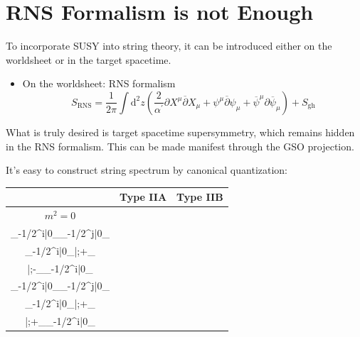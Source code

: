 \documentclass{beamer}
\begin{document}
\section[Why PS?]{RNS Formalism is not Enough}
	\begin{frame}
		To incorporate SUSY into string theory, it can be introduced either on the worldsheet or in the target spacetime.
		\begin{itemize}
			\item {\color{WHU} On the worldsheet: RNS formalism} 
			\begin{equation*}
				S_{\text{RNS}}=\frac{1}{2\pi}\int\mathrm{d}^2z\left(\frac{2}{\alpha^{\prime}}\partial X^\mu\overline{\partial}X_\mu+\psi^\mu\overline{\partial}\psi_\mu+\overline{\psi}^\mu\partial\overline{\psi}_\mu\right)+S_{\text{gh}}
			\end{equation*}
		\end{itemize}
		What is truly desired is target spacetime supersymmetry, which remains hidden in the RNS formalism. This can be made manifest through the {\color{WHU} GSO projection}. 
		
		It's easy to construct string spectrum by canonical quantization:
		\begin{table}[htbp]
			\centering
			\begin{tabular}{c|cc}
				\hline
				&Type IIA &Type IIB\\
				\hline
				$m^2=0$ 
				&\(\displaystyle
				\begin{gathered}
					|\alpha;-\rangle_{\mathrm{R}}\otimes|\alpha;+\rangle_{\mathrm{R}}\\\tilde{\psi}_{-1/2}^i|0\rangle_{\mathrm{NS}}\otimes \psi_{-1/2}^j|0\rangle_{\mathrm{NS}}\\\tilde{\psi}_{-1/2}^i|0\rangle_{\mathrm{NS}}\otimes|\alpha;+\rangle_{\mathrm{R}}\\|\dot\alpha;-\rangle_{\mathrm{R}}\otimes \psi_{-1/2}^i|0\rangle_{\mathrm{NS}}
				\end{gathered}
				\)
				&\(\displaystyle
				\begin{gathered}
					|\alpha;+\rangle_{\mathrm{R}}\otimes|\alpha;+\rangle_{\mathrm{R}}\\\tilde{\psi}_{-1/2}^i|0\rangle_{\mathrm{NS}}\otimes \psi_{-1/2}^j|0\rangle_{\mathrm{NS}}\\\tilde{\psi}_{-1/2}^i|0\rangle_{\mathrm{NS}}\otimes|\alpha;+\rangle_{\mathrm{R}}\\|\alpha;+\rangle_{\mathrm{R}}\otimes \psi_{-1/2}^i|0\rangle_{\mathrm{NS}}
				\end{gathered}
				\)\\
				\hline
			\end{tabular}
		\end{table}
	\end{frame}
\end{document}
